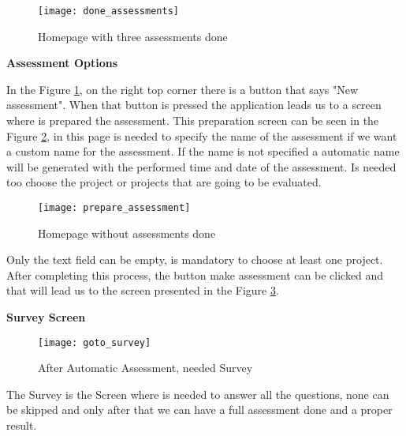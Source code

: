 \begin{figure}[!htb]
	\begin{center}
		\leavevmode
		\texttt{[image: done\_assessments]}
		\caption{Homepage with three assessments done}
		\label{fig:done_assessments}
	\end{center}
\end{figure}


\vspace{10 mm}

\textbf{Assessment Options}

In the Figure \ref{fig:done_assessments}, on the right top corner there is a button that says "New assessment". When that button is pressed the application leads us to a screen where is prepared the assessment. This preparation screen can be seen in the Figure \ref{fig:prepare_assessment}, in this page is needed to specify the name of the assessment if we want a custom name for the assessment. If the name is not specified a automatic name will be generated with the performed time and date of the assessment. Is needed too choose the project or projects that are going to be evaluated.

\begin{figure}[!htb]
	\begin{center}
		\leavevmode
		\texttt{[image: prepare\_assessment]}
		\caption{Homepage without assessments done}
		\label{fig:prepare_assessment}
	\end{center}
\end{figure}

Only the text field can be empty, is mandatory to choose at least one project. After completing this process, the button make assessment can be clicked and that will lead us to the screen presented in the Figure \ref{fig:goto_survey}.

\vspace{10 mm}

\textbf{Survey Screen}

\begin{figure}[!htb]
	\begin{center}
		\leavevmode
		\texttt{[image: goto\_survey]}
		\caption{After Automatic Assessment, needed Survey}
		\label{fig:goto_survey}
	\end{center}
\end{figure}

The Survey is the Screen where is needed to answer all the questions, none can be skipped and only after that we can have a full assessment done and a proper result.

